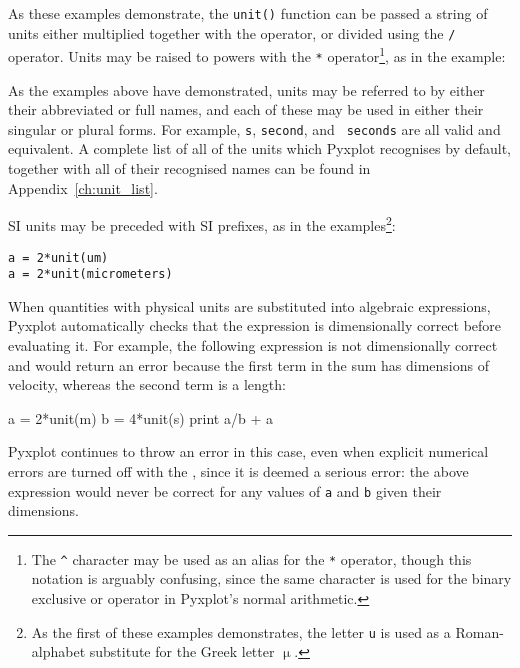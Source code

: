 \noindent As these examples demonstrate, the {\tt unit()} function can be
passed a string of units either multiplied together with the {\tt *} operator,
or divided using the {\tt /} operator. Units may be raised to powers with the
{\tt **} operator\footnote{The {\tt \^{}} character may be used as an alias for
the {\tt **} operator, though this notation is arguably confusing, since the
same character is used for the binary exclusive or operator in Pyxplot's normal
arithmetic.}, as in the example:

\vspace{3mm}

\vspace{3mm}

\noindent As the examples above have demonstrated, units may be referred to by
either their abbreviated or full names, and each of these may be used in either
their singular or plural forms. For example, {\tt s}, {\tt second}, and {\tt
seconds} are all valid and equivalent. A complete list of all of the units
which Pyxplot recognises by default, together with all of their recognised
names can be found in Appendix~\ref{ch:unit_list}.

SI units may be preceded with SI prefixes, as in
the examples\footnote{As the first of these examples demonstrates, the letter
{\tt u} is used as a Roman-alphabet substitute for the Greek letter $\upmu$.}:

\begin{verbatim}
a = 2*unit(um)
a = 2*unit(micrometers)
\end{verbatim}

When quantities with physical units are substituted into algebraic expressions,
Pyxplot automatically checks that the expression is dimensionally correct
before evaluating it. For example, the following expression is not
dimensionally correct and would return an error because the first term in the
sum has dimensions of velocity, whereas the second term is a length:

\begin{dontdo}
a = 2*unit(m)\newline
b = 4*unit(s)\newline
print a/b + a
\end{dontdo}

\noindent Pyxplot continues to throw an error in this case, even when explicit
numerical errors are turned off with the ,
since it is deemed a serious error: the above expression would never be correct
for any values of {\tt a} and {\tt b} given their dimensions.

